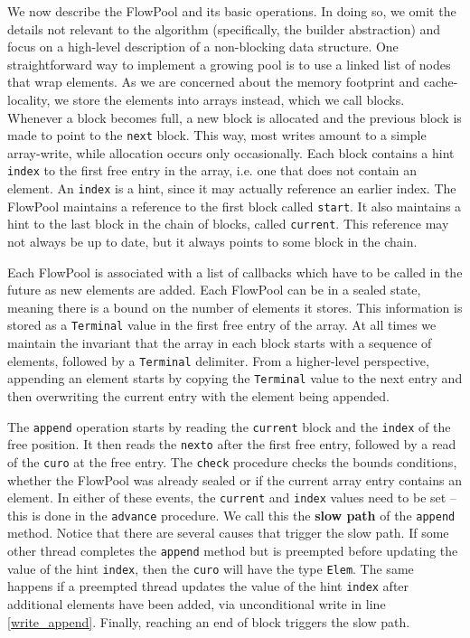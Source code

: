 \documentclass[runningheads,a4paper]{llncs}
\begin{document}
We now describe the FlowPool and its basic operations.
In doing so, we omit the details not relevant to the algorithm
(specifically, the builder abstraction) and
focus on a high-level description of a non-blocking data structure.
One straightforward way to implement a growing pool is to use a linked
list of nodes that wrap elements.
As we are concerned about the memory footprint and cache-locality, we
store the elements into arrays instead, which we call blocks.
Whenever a block becomes full, a new block is allocated and the
previous block is made to point to the \verb=next= block.
This way, most writes amount to a simple array-write, while allocation
occurs only occasionally.
Each block contains a hint \verb=index= to the first free entry in
the array, i.e. one that does not contain an element.
An \verb=index= is a hint, since it may actually reference an earlier index.
The FlowPool maintains a reference to the first block called
\verb=start=.
It also maintains a hint to the last block in the chain of blocks,
called \verb=current=.
This reference may not always be up to date, but it always points
to some block in the chain.

Each FlowPool is associated with a list of callbacks which have
to be called in the future as new elements are added.
Each FlowPool can be in a sealed state, meaning there is a bound on
the number of elements it stores.
This information is stored as a \verb=Terminal= value in the first
free entry of the array.
At all times we maintain the invariant that the array in each block
starts with a sequence of elements, followed by a \verb=Terminal=
delimiter. From a higher-level perspective, appending an element
starts by copying the \verb=Terminal= value to the next entry and then
overwriting the current entry with the element being appended.

The \verb=append= operation starts by reading the \verb=current= block
and the \verb=index= of the free position.
It then reads the
\verb=nexto= after the first free entry, followed by a read of the
\verb=curo= at the free entry.
The \verb=check= procedure checks the bounds conditions, whether the
FlowPool was already sealed or if the current array entry contains an
element.
In either of these events, the \verb=current= and \verb=index= values
need to be set -- this is done in the \verb=advance= procedure.
We call this the \textbf{slow path} of the \verb=append= method.
Notice that there are several causes that trigger the slow path.
If some other thread completes the \verb=append= method but is
preempted before updating the value of the hint \verb=index=, then the
\verb=curo= will have the type \verb=Elem=.
The same happens if a preempted thread updates the value of the
hint \verb=index= after additional elements have been added,
via unconditional write in line \ref{write_append}.
Finally, reaching an end of block triggers the slow path.
\end{document}
